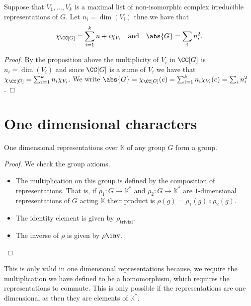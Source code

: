 \documentclass[12pt, a4paper]{article}
\newcommand{\KK}{\mathbb{K}}
\begin{document}
\begin{corollary}
    Suppose that \(V_1,\ldots,V_k\) is a maximal list of non-isomorphic complex irreducible representations of \(G\). Let \(n_i =\dim(V_i)\) thne we have that 
    \[\chi_{\CC[G]}=\sum_{i=1}^k n+i \chi_{V_i} \quad \text{and} \quad \abs{G}=\sum_i n_i^2.\]
\end{corollary}

\begin{proof}
    By the proposition above the multiplicity of \(V_i\) in \(\CC[G]\) is \(n_i=\dim(V_i)\) and since \(\CC[G]\) is a sume of \(V_i\) we have that \(\chi_{\CC[G]}= \sum_{i=1}^k n_i \chi_{V_i}\). We write \(\abs{G} =\chi_{\CC[G]}(e)=\sum_{i=1}^k n_i \chi_{V_i}(e)= \sum_i n_i^2\).
\end{proof}

\section{One dimensional characters}

\begin{proposition}
    One dimensional representations over \(\KK\) of any group \(G\) form a group.
\end{proposition}

\begin{proof}
    We check the group axioms.
    \begin{itemize}
        \item The multiplication on this group is defined by the composition of representations. That is, if \(\rho_1 :G \to \KK^*\) and \(\rho_2:G \to \KK^*\) are \(1\)-dimensional representations of \(G\) acting \(\KK\) their product is \(\rho(g) = \rho_1(g) \circ \rho_2(g)\).
        \item The identity element is given by \(\rho_{\text{trivial}}\).
        \item The inverse of \(\rho\) is given by \(\rho\inv\). 
    \end{itemize}
\end{proof}

\begin{mdremark}
    This is only valid in one dimensional representations because, we require the multiplication we have defined to be a homomorphism, which requires the representations to commute. This is only possible if the representations are one dimensional as then they are elements of \(\KK^*\).
\end{mdremark}
\end{document}
